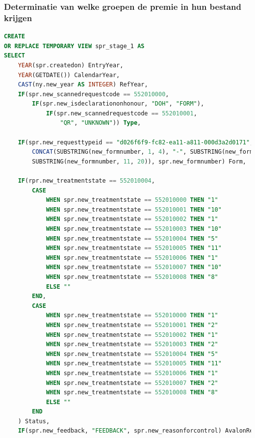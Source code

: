 \subsubsection{Determinatie van welke groepen de premie in hun bestand krijgen}


\begin{lstlisting}[language=SQL, caption={Join van de tabel ``new\_year'' op de tabel ``new\_syndicalpremiumrequest'' en berekenen van de kolommen ``EntryYear'', ``CalendarYear'' en ``RefYear''.}, style=myStyle]
CREATE
OR REPLACE TEMPORARY VIEW spr_stage_1 AS
SELECT 
    YEAR(spr.createdon) EntryYear,
    YEAR(GETDATE()) CalendarYear,
    CAST(ny.new_year AS INTEGER) RefYear,
    IF(spr.new_scannedrequestcode == 552010000, 
        IF(spr.new_isdeclarationonhonour, "DOH", "FORM"), 
            IF(spr.new_scannedrequestcode == 552010001, 
                "QR", "UNKNOWN")) Type,
    
    IF(spr.new_requesttypeid == "d026f6f9-fc82-ea11-a811-000d3a2d0171", 
        CONCAT(SUBSTRING(new_formnumber, 1, 4), "-", SUBSTRING(new_formnumber, 5, 6), "-", 
        SUBSTRING(new_formnumber, 11, 20)), spr.new_formnumber) Form,
    
    IF(rpr.new_treatmentstate == 552010004,
        CASE
            WHEN spr.new_treatmentstate == 552010000 THEN "1"
            WHEN spr.new_treatmentstate == 552010001 THEN "10"
            WHEN spr.new_treatmentstate == 552010002 THEN "1"
            WHEN spr.new_treatmentstate == 552010003 THEN "10"
            WHEN spr.new_treatmentstate == 552010004 THEN "5"
            WHEN spr.new_treatmentstate == 552010005 THEN "11"
            WHEN spr.new_treatmentstate == 552010006 THEN "1"
            WHEN spr.new_treatmentstate == 552010007 THEN "10"
            WHEN spr.new_treatmentstate == 552010008 THEN "8"
            ELSE ""
        END,
        CASE
            WHEN spr.new_treatmentstate == 552010000 THEN "1"
            WHEN spr.new_treatmentstate == 552010001 THEN "2"
            WHEN spr.new_treatmentstate == 552010002 THEN "1"
            WHEN spr.new_treatmentstate == 552010003 THEN "2"
            WHEN spr.new_treatmentstate == 552010004 THEN "5"
            WHEN spr.new_treatmentstate == 552010005 THEN "11"
            WHEN spr.new_treatmentstate == 552010006 THEN "1"
            WHEN spr.new_treatmentstate == 552010007 THEN "2"
            WHEN spr.new_treatmentstate == 552010008 THEN "8"
            ELSE ""
        END
    ) Status,
    IF(spr.new_feedback, "FEEDBACK", spr.new_reasonforcontrol) AvalonRemark,
    

\end{lstlisting}
